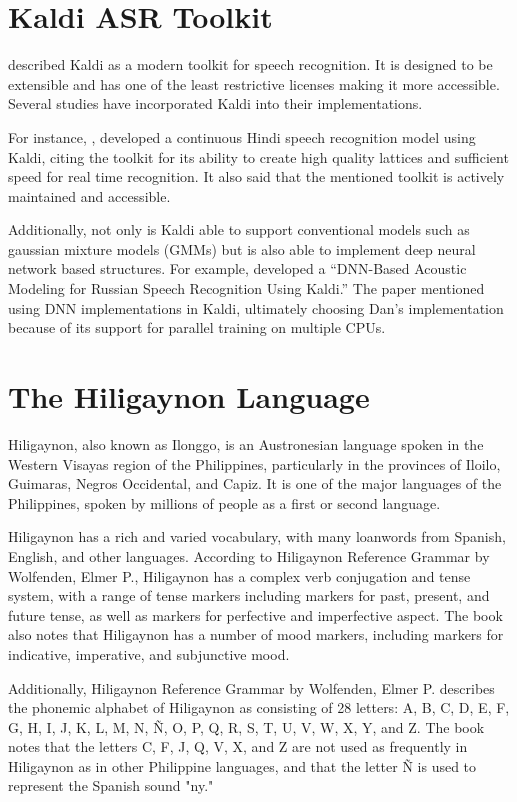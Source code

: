 \section{Kaldi ASR Toolkit}
\citeauthor{povey-2011} \citeyear{povey-2011} described Kaldi as a modern toolkit for speech recognition. It is designed to be extensible and has one of the least restrictive licenses making it more accessible. Several studies have incorporated Kaldi into their implementations. 

For instance, \citeauthor{upadhyaya-2017} \citeyear{upadhyaya-2017} , developed a continuous Hindi speech recognition model using Kaldi, citing the toolkit for its ability to create high quality lattices and sufficient speed for real time recognition. It also said that the mentioned toolkit is actively maintained and accessible. 

Additionally, not only is Kaldi able to support conventional models such as gaussian mixture models (GMMs) but is also able to implement deep neural network based structures. For example, \citeauthor{kipyatkova-2016} \citeyear{kipyatkova-2016} developed a “DNN-Based Acoustic Modeling for Russian Speech Recognition Using Kaldi.” The paper mentioned using DNN implementations in Kaldi, ultimately choosing Dan’s implementation because of its support for parallel training on multiple CPUs.


\section{The Hiligaynon Language}
Hiligaynon, also known as Ilonggo, is an Austronesian language spoken in the Western Visayas region of the Philippines, particularly in the provinces of Iloilo, Guimaras, Negros Occidental, and Capiz. It is one of the major languages of the Philippines, spoken by millions of people as a first or second language.

Hiligaynon has a rich and varied vocabulary, with many loanwords from Spanish, English, and other languages. According to Hiligaynon Reference Grammar by Wolfenden, Elmer P., Hiligaynon has a complex verb conjugation and tense system, with a range of tense markers including markers for past, present, and future tense, as well as markers for perfective and imperfective aspect. The book also notes that Hiligaynon has a number of mood markers, including markers for indicative, imperative, and subjunctive mood.

Additionally, Hiligaynon Reference Grammar by Wolfenden, Elmer P. describes the phonemic alphabet of Hiligaynon as consisting of 28 letters: A, B, C, D, E, F, G, H, I, J, K, L, M, N, Ñ, O, P, Q, R, S, T, U, V, W, X, Y, and Z. The book notes that the letters C, F, J, Q, V, X, and Z are not used as frequently in Hiligaynon as in other Philippine languages, and that the letter Ñ is used to represent the Spanish sound "ny."

















